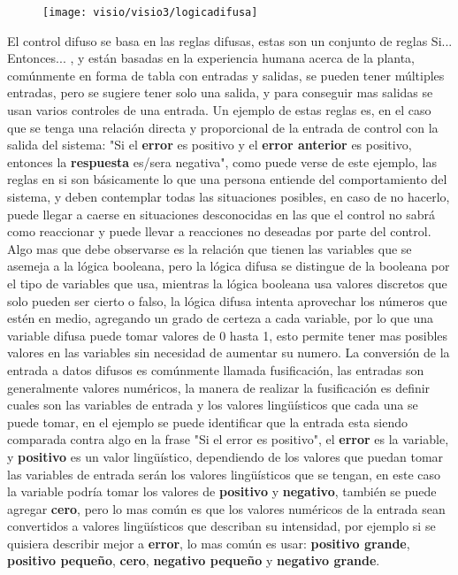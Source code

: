 \begin{figure}[h]
	\centering
	\texttt{[image: visio/visio3/logicadifusa]}
	\caption{}
	\label{fig:logicadifusa}
\end{figure}

El control difuso se basa en las reglas difusas, estas son un conjunto de reglas Si... Entonces... , y están basadas en la experiencia humana acerca de la planta, comúnmente en forma de tabla con entradas y salidas, se pueden tener múltiples entradas, pero se sugiere tener solo una salida, y para conseguir mas salidas se usan varios controles de una entrada. Un ejemplo de estas reglas es, en el caso que se tenga una relación directa y proporcional de la entrada de control con la salida del sistema: "Si el \textbf{error} es positivo y el \textbf{error anterior} es positivo, entonces la \textbf{respuesta} es/sera negativa", como puede verse de este ejemplo, las reglas en si son básicamente lo que una persona entiende del comportamiento del sistema, y deben contemplar todas las situaciones posibles, en caso de no hacerlo, puede llegar a caerse en situaciones desconocidas en las que el control no sabrá como reaccionar y puede llevar a reacciones no deseadas por parte del control. Algo mas que debe observarse es la relación que tienen las variables que se asemeja a la lógica booleana, pero la lógica difusa se distingue de la booleana por el tipo de variables que usa, mientras la lógica booleana usa valores discretos que solo pueden ser cierto o falso, la lógica difusa intenta aprovechar los números que estén en medio, agregando un grado de certeza a cada variable, por lo que una variable difusa puede tomar valores de 0 hasta 1, esto permite tener mas posibles valores en las variables sin necesidad de aumentar su numero.
La conversión de la entrada a datos difusos es comúnmente llamada  fusificación, las entradas son generalmente valores numéricos, la manera de realizar la fusificación es definir cuales son las variables de entrada y los valores lingüísticos que cada una se puede tomar, en el ejemplo se puede identificar que la entrada esta siendo comparada contra algo en la frase "Si el error es positivo", el \textbf{error} es la variable, y \textbf{positivo} es un valor lingüístico, dependiendo de los valores que puedan tomar las variables de entrada serán los valores lingüísticos que se tengan, en este caso la variable podría tomar los valores de \textbf{positivo} y \textbf{negativo}, también se puede agregar \textbf{cero}, pero lo mas común es que los valores numéricos de la entrada sean convertidos a valores lingüísticos que describan su intensidad, por ejemplo si se quisiera describir mejor a \textbf{error}, lo mas común es usar: \textbf{positivo grande},  \textbf{positivo pequeño}, \textbf{cero}, \textbf{negativo pequeño} y \textbf{negativo grande}. 

